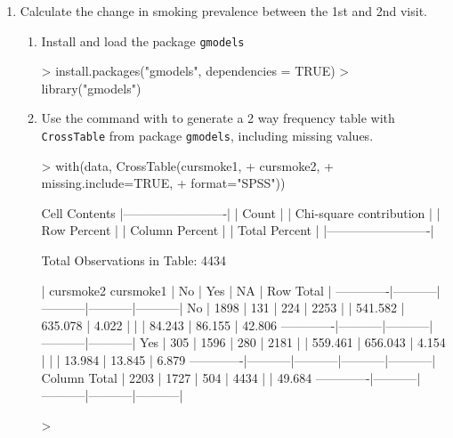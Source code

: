 \documentclass{article}
\begin{document}
\begin{enumerate}
\item Calculate the change in smoking prevalence between the 1st and 2nd visit.
\begin{enumerate}
  \item Install and load the package \texttt{gmodels}
\begin{Schunk}
\begin{Sinput}
> install.packages("gmodels", dependencies = TRUE)
> library("gmodels")
\end{Sinput}
\end{Schunk}
\pagebreak
\item Use the command with to generate a 2 way frequency table with \texttt{CrossTable} from package \texttt{gmodels}, including missing values.
\begin{Schunk}
\begin{Sinput}
> with(data, CrossTable(cursmoke1, 
+                       cursmoke2, 
+                       missing.include=TRUE, 
+                       format="SPSS"))
\end{Sinput}
\begin{Soutput}
   Cell Contents
|-------------------------|
|                   Count |
| Chi-square contribution |
|             Row Percent |
|          Column Percent |
|           Total Percent |
|-------------------------|

Total Observations in Table:  4434 

             | cursmoke2 
   cursmoke1 |       No  |      Yes  |       NA  | Row Total | 
-------------|-----------|-----------|-----------|-----------|
          No |     1898  |      131  |      224  |     2253  | 
             |  541.582  |  635.078  |    4.022  |           | 
             |   84.243% |    5.814% |    9.942% |   50.812% | 
             |   86.155% |    7.585% |   44.444% |           | 
             |   42.806% |    2.954% |    5.052% |           | 
-------------|-----------|-----------|-----------|-----------|
         Yes |      305  |     1596  |      280  |     2181  | 
             |  559.461  |  656.043  |    4.154  |           | 
             |   13.984% |   73.177% |   12.838% |   49.188% | 
             |   13.845% |   92.415% |   55.556% |           | 
             |    6.879% |   35.995% |    6.315% |           | 
-------------|-----------|-----------|-----------|-----------|
Column Total |     2203  |     1727  |      504  |     4434  | 
             |   49.684% |   38.949% |   11.367% |           | 
-------------|-----------|-----------|-----------|-----------|
\end{Soutput}
\begin{Sinput}
> 
\end{Sinput}
\end{Schunk}


\end{enumerate}
\end{enumerate}
\end{document}
